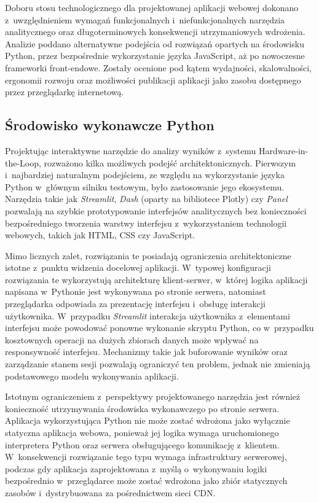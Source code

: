Doboru stosu technologicznego dla projektowanej aplikacji webowej dokonano z~uwzględnieniem wymagań funkcjonalnych i~niefunkcjonalnych narzędzia analitycznego oraz długoterminowych konsekwencji utrzymaniowych wdrożenia.
Analizie poddano alternatywne podejścia od rozwiązań opartych na środowisku Python, przez bezpośrednie wykorzystanie języka JavaScript, aż po nowoczesne frameworki front-endowe.
Zostały ocenione pod kątem wydajności, skalowalności, ergonomii rozwoju oraz możliwości publikacji aplikacji jako zasobu dostępnego przez przeglądarkę internetową.

\subsection{Środowisko wykonawcze Python}
\label{subsec:srodowisko-wykonawcze-python}

Projektując interaktywne narzędzie do analizy wyników z~systemu Hardware-in-the-Loop, rozważono kilka możliwych podejść architektonicznych.
Pierwszym i~najbardziej naturalnym podejściem, ze względu na wykorzystanie języka Python w~głównym silniku testowym, było zastosowanie jego ekosystemu.
Narzędzia takie jak \textit{Streamlit}, \textit{Dash} (oparty na bibliotece Plotly) czy \textit{Panel} pozwalają na szybkie prototypowanie interfejsów analitycznych bez konieczności bezpośredniego tworzenia warstwy interfejsu z~wykorzystaniem technologii webowych, takich jak HTML, CSS czy JavaScript.

Mimo licznych zalet, rozwiązania te posiadają ograniczenia architektoniczne istotne z~punktu widzenia docelowej aplikacji.
W~typowej konfiguracji rozwiązania te wykorzystują architekturę klient-serwer, w~której logika aplikacji napisana w~Pythonie jest wykonywana po stronie serwera, natomiast przeglądarka odpowiada za prezentację interfejsu i~obsługę interakcji użytkownika.
W~przypadku \textit{Streamlit} interakcja użytkownika z~elementami interfejsu może powodować ponowne wykonanie skryptu Python, co w~przypadku kosztownych operacji na dużych zbiorach danych może wpływać na responsywność interfejsu.
Mechanizmy takie jak buforowanie wyników oraz zarządzanie stanem sesji pozwalają ograniczyć ten problem, jednak nie zmieniają podstawowego modelu wykonywania aplikacji.

Istotnym ograniczeniem z~perspektywy projektowanego narzędzia jest również konieczność utrzymywania środowiska wykonawczego po stronie serwera.
Aplikacja wykorzystująca Python nie może zostać wdrożona jako wyłącznie statyczna aplikacja webowa, ponieważ jej logika wymaga uruchomionego interpretera Python oraz serwera obsługującego komunikację z~klientem.
W~konsekwencji rozwiązanie tego typu wymaga infrastruktury serwerowej, podczas gdy aplikacja zaprojektowana z~myślą o~wykonywaniu logiki bezpośrednio w~przeglądarce może zostać wdrożona jako zbiór statycznych zasobów i~dystrybuowana za pośrednictwem sieci CDN.

